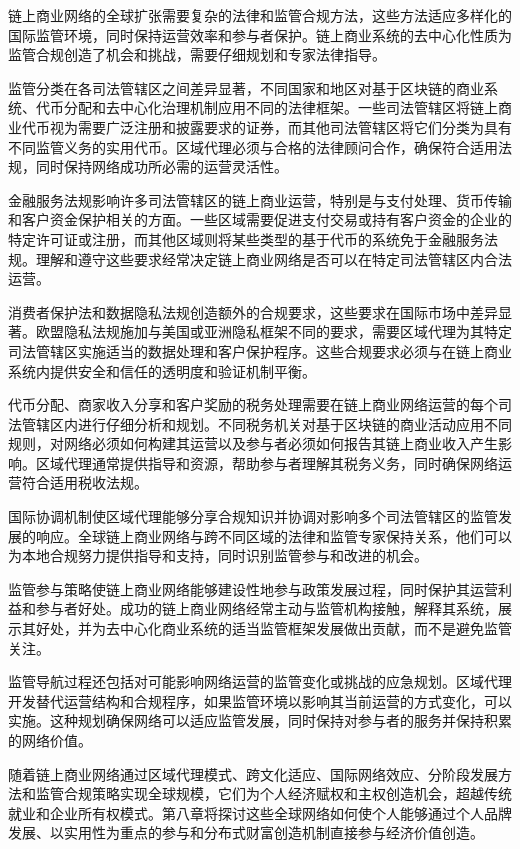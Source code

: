 \documentclass[
  Letterpaper,
]{scrbook}
\begin{document}
链上商业网络的全球扩张需要复杂的法律和监管合规方法，这些方法适应多样化的国际监管环境，同时保持运营效率和参与者保护。链上商业系统的去中心化性质为监管合规创造了机会和挑战，需要仔细规划和专家法律指导。

监管分类在各司法管辖区之间差异显著，不同国家和地区对基于区块链的商业系统、代币分配和去中心化治理机制应用不同的法律框架。一些司法管辖区将链上商业代币视为需要广泛注册和披露要求的证券，而其他司法管辖区将它们分类为具有不同监管义务的实用代币。区域代理必须与合格的法律顾问合作，确保符合适用法规，同时保持网络成功所必需的运营灵活性。

金融服务法规影响许多司法管辖区的链上商业运营，特别是与支付处理、货币传输和客户资金保护相关的方面。一些区域需要促进支付交易或持有客户资金的企业的特定许可证或注册，而其他区域则将某些类型的基于代币的系统免于金融服务法规。理解和遵守这些要求经常决定链上商业网络是否可以在特定司法管辖区内合法运营。

消费者保护法和数据隐私法规创造额外的合规要求，这些要求在国际市场中差异显著。欧盟隐私法规施加与美国或亚洲隐私框架不同的要求，需要区域代理为其特定司法管辖区实施适当的数据处理和客户保护程序。这些合规要求必须与在链上商业系统内提供安全和信任的透明度和验证机制平衡。

代币分配、商家收入分享和客户奖励的税务处理需要在链上商业网络运营的每个司法管辖区内进行仔细分析和规划。不同税务机关对基于区块链的商业活动应用不同规则，对网络必须如何构建其运营以及参与者必须如何报告其链上商业收入产生影响。区域代理通常提供指导和资源，帮助参与者理解其税务义务，同时确保网络运营符合适用税收法规。

国际协调机制使区域代理能够分享合规知识并协调对影响多个司法管辖区的监管发展的响应。全球链上商业网络与跨不同区域的法律和监管专家保持关系，他们可以为本地合规努力提供指导和支持，同时识别监管参与和改进的机会。

监管参与策略使链上商业网络能够建设性地参与政策发展过程，同时保护其运营利益和参与者好处。成功的链上商业网络经常主动与监管机构接触，解释其系统，展示其好处，并为去中心化商业系统的适当监管框架发展做出贡献，而不是避免监管关注。

监管导航过程还包括对可能影响网络运营的监管变化或挑战的应急规划。区域代理开发替代运营结构和合规程序，如果监管环境以影响其当前运营的方式变化，可以实施。这种规划确保网络可以适应监管发展，同时保持对参与者的服务并保持积累的网络价值。

随着链上商业网络通过区域代理模式、跨文化适应、国际网络效应、分阶段发展方法和监管合规策略实现全球规模，它们为个人经济赋权和主权创造机会，超越传统就业和企业所有权模式。第八章将探讨这些全球网络如何使个人能够通过个人品牌发展、以实用性为重点的参与和分布式财富创造机制直接参与经济价值创造。
\end{document}
